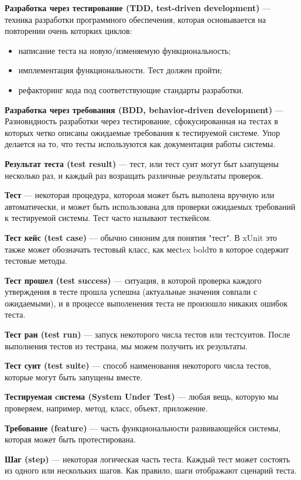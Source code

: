 {\bf Разработка через тестирование (TDD, test-driven development)} ---
техника разработки программного обеспечения, которая основывается на повторении очень которких циклов:

\begin{itemize}
\item написание теста на новую/изменяемую функциональность;
\item имплементация функциональности. Тест должен пройти;
\item рефакторинг кода под соответствующие стандарты разработки.
\end{itemize}

{\bf Разработка через требования (BDD, behavior-driven development)} ---
Разновидность разработки через тестирование, сфокусированная на тестах в которых четко описаны ожидаемые требования к тестируемой системе. Упор делается на то, что тесты используются как документация работы системы.

{\bf Результат теста (test result)} ---
тест, или тест суит могут быт ьзапущены несколько раз, и каждый раз возращать различные результаты проверок.

{\bf Тест} ---
некоторая процедура, котороая может быть выполена вручную или автоматически, и может быть использована для проверки ожидаемых требований к тестируемой системы. Тест часто называют тесткейсом.

{\bf Тест кейс (test case)} ---
обычно синоним для понятия "тест". В xUnit это также может обозначать тестовый класс, как месtex boldто в которое содержит тестовые методы.

{\bf Тест прошел (test success)} ---
ситуация, в которой проверка каждого утверждения в тесте прошла успешна (актуальные значения совпали с ожидаемыми), и в процессе выполенения теста не произошло никаких ошибок теста.

{\bf Тест ран (test run)} ---
запуск некоторого числа тестов или тестсуитов. После выполнения тестов из тестрана, мы можем получить их результаты.

{\bf Тест суит (test suite)} ---
способ наименования некоторого числа тестов, которые могут быть запущены вместе.

{\bf Тестируемая cистема (System Under Test)} ---
любая вещь, которую мы проверяем, например, метод, класс, объект, приложение.

{\bf Требование (feature)} ---
часть функциональности развивающейся системы, которая может быть протестирована.

{\bf Шаг (step)} ---
некоторая логическая часть теста. Каждый тест может состоять из одного или нескольких шагов. Как правило, шаги отображают сценарий теста.

